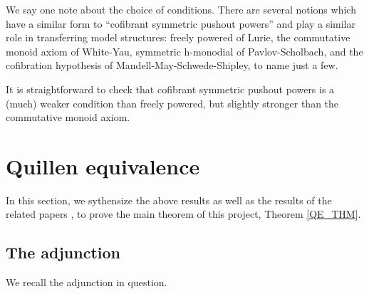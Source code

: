 \documentclass[a4paper,10pt
,draft
]{article}%
\renewcommand{\1}{\eta}%
\begin{document}
{  \begin{remark}
        We say one note about the choice of conditions. There are several notions which have a similar form to
        ``cofibrant symmetric pushout powers'' and play a similar role in transferring model structures:
        freely powered of Lurie,
        the commutative monoid axiom of White-Yau,
        symmetric h-monodial of Pavlov-Scholbach,
        and the cofibration hypothesis of Mandell-May-Schwede-Shipley,
        to name just a few.

        It is straightforward to check that cofibrant symmetric pushout powers is a (much) weaker condition than freely powered,
        but slightly stronger than the commutative monoid axiom.

  \end{remark}


} %








\newpage

\section{Quillen equivalence}

In this section, we sythensize the above results as well as the results of the related papers \cite{BP_geo,BP_edss,Per_eds},
to prove the main theorem of this project, Theorem \ref{QE_THM}.

\subsection{The adjunction}
We recall the adjunction in question.
\end{document}
